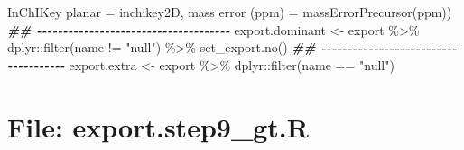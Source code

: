 \documentclass[
]{article}
\newenvironment{Shaded}{\begin{snugshade}}{\end{snugshade}}
\newcommand{\AttributeTok}[1]{\textcolor[rgb]{0.77,0.63,0.00}{#1}}
\newcommand{\DocumentationTok}[1]{\textcolor[rgb]{0.56,0.35,0.01}{\textbf{\textit{#1}}}}
\newcommand{\FunctionTok}[1]{\textcolor[rgb]{0.00,0.00,0.00}{#1}}
\newcommand{\NormalTok}[1]{#1}
\newcommand{\OtherTok}[1]{\textcolor[rgb]{0.56,0.35,0.01}{#1}}
\newcommand{\SpecialCharTok}[1]{\textcolor[rgb]{0.00,0.00,0.00}{#1}}
\newcommand{\StringTok}[1]{\textcolor[rgb]{0.31,0.60,0.02}{#1}}
\begin{document}
\begin{Shaded}
\begin{Highlighting}[]
                \StringTok{\textasciigrave{}}\AttributeTok{InChIKey planar}\StringTok{\textasciigrave{}} \OtherTok{=}\NormalTok{ inchikey2D,}
                \StringTok{\textasciigrave{}}\AttributeTok{mass error (ppm)}\StringTok{\textasciigrave{}} \OtherTok{=} \StringTok{\textasciigrave{}}\AttributeTok{massErrorPrecursor(ppm)}\StringTok{\textasciigrave{}}\NormalTok{)}
\DocumentationTok{\#\# {-}{-}{-}{-}{-}{-}{-}{-}{-}{-}{-}{-}{-}{-}{-}{-}{-}{-}{-}{-}{-}{-}{-}{-}{-}{-}{-}{-}{-}{-}{-}{-}{-}{-}{-}{-}{-} }
\NormalTok{export.dominant }\OtherTok{\textless{}{-}}\NormalTok{ export }\SpecialCharTok{\%\textgreater{}\%} 
\NormalTok{  dplyr}\SpecialCharTok{::}\FunctionTok{filter}\NormalTok{(name }\SpecialCharTok{!=} \StringTok{"null"}\NormalTok{) }\SpecialCharTok{\%\textgreater{}\%} 
  \FunctionTok{set\_export.no}\NormalTok{()}
\DocumentationTok{\#\# {-}{-}{-}{-}{-}{-}{-}{-}{-}{-}{-}{-}{-}{-}{-}{-}{-}{-}{-}{-}{-}{-}{-}{-}{-}{-}{-}{-}{-}{-}{-}{-}{-}{-}{-}{-}{-} }
\NormalTok{export.extra }\OtherTok{\textless{}{-}}\NormalTok{ export }\SpecialCharTok{\%\textgreater{}\%} 
\NormalTok{  dplyr}\SpecialCharTok{::}\FunctionTok{filter}\NormalTok{(name }\SpecialCharTok{==} \StringTok{"null"}\NormalTok{)}
\end{Highlighting}
\end{Shaded}

\hypertarget{file-export.step9_gt.r}{%
\section{File: export.step9\_gt.R}\label{file-export.step9_gt.r}}
\end{document}
